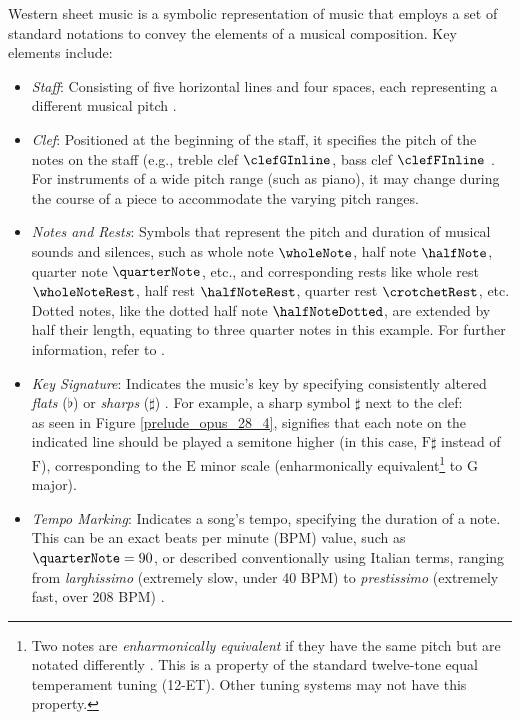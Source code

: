 Western sheet music is a symbolic representation of music that employs a set of standard notations to convey the elements of a musical composition. Key elements include:
\begin{itemize}
   \item \emph{Staff}: Consisting of five horizontal lines and four spaces, each representing a different musical pitch \cite[p.~27]{Read1969}.
   \item \emph{Clef}: Positioned at the beginning of the staff, it specifies the pitch of the notes on the staff (e.g., treble clef $\clefGInline$, bass clef $\clefFInline$ \cite[p.~51--55]{Read1969}. For instruments of a wide pitch range (such as piano), it may change during the course of a piece to accommodate the varying pitch ranges.
   \item \emph{Notes and Rests}: Symbols that represent the pitch and duration of musical sounds and silences, such as whole note $\wholeNote$, half note $\halfNote$, quarter note $\quarterNote$, etc., and corresponding rests like whole rest $\wholeNoteRest$, half rest $\halfNoteRest$, quarter rest $\crotchetRest$, etc. Dotted notes, like the dotted half note $\halfNoteDotted$, are extended by half their length, equating to three quarter notes in this example. For further information, refer to \cite[p.~64--65, 96, 103, 113--114]{Read1969}.
   \item \emph{Key Signature}: Indicates the music's key by specifying consistently altered \emph{flats} ($\flat$) or \emph{sharps} ($\sharp$) \cite[p.~135--136]{Read1969}. For example, a sharp symbol $\sharp$ next to the clef: \[\] as seen in Figure \ref{prelude_opus_28_4}, signifies that each note on the indicated line should be played a semitone higher (in this case, $\textrm{F}\sharp$ instead of $\textrm{F}$), corresponding to the $\textrm{E}$ minor scale (enharmonically equivalent\footnote{Two notes are \emph{enharmonically equivalent} if they have the same pitch but are notated differently \cite[p.~10]{Kostka1994}. This is a property of the standard twelve-tone equal temperament tuning (12-ET). Other tuning systems may not have this property.} to $\textrm{G}$ major).
   \item \emph{Tempo Marking}: Indicates a song's tempo, specifying the duration of a note. This can be an exact beats per minute (BPM) value, such as $\quarterNote = 90$, or described conventionally using Italian terms, ranging from \emph{larghissimo} (extremely slow, under 40 BPM) to \emph{prestissimo} (extremely fast, over 208 BPM) \cite[p.~276--277]{Read1969}.

\end{itemize}
